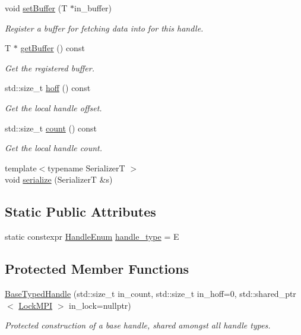 \begin{DoxyCompactItemize}
void \hyperlink{structvt_1_1rdma_1_1_base_typed_handle_acd1c1ff4fa00ba44ff7d7d6d92e82e5b}{set\+Buffer} (T $\ast$in\+\_\+buffer)
\begin{DoxyCompactList}\small\item\em Register a buffer for fetching data into for this handle. \end{DoxyCompactList}\item 
T $\ast$ \hyperlink{structvt_1_1rdma_1_1_base_typed_handle_a6774922e581a9b8c19eccf749077f577}{get\+Buffer} () const
\begin{DoxyCompactList}\small\item\em Get the registered buffer. \end{DoxyCompactList}\item 
std\+::size\+\_\+t \hyperlink{structvt_1_1rdma_1_1_base_typed_handle_a98bab5e776934a84c4415952823f58e0}{hoff} () const
\begin{DoxyCompactList}\small\item\em Get the local handle offset. \end{DoxyCompactList}\item 
std\+::size\+\_\+t \hyperlink{structvt_1_1rdma_1_1_base_typed_handle_a1e7937b5cf4b641a783c37675ae2cc35}{count} () const
\begin{DoxyCompactList}\small\item\em Get the local handle count. \end{DoxyCompactList}\item 
{\footnotesize template$<$typename SerializerT $>$ }\\void \hyperlink{structvt_1_1rdma_1_1_base_typed_handle_a40156625b7effaa3ba9febceb829e9a0}{serialize} (SerializerT \&s)
\end{DoxyCompactItemize}
\subsection*{Static Public Attributes}
\begin{DoxyCompactItemize}
\item 
static constexpr \hyperlink{namespacevt_1_1rdma_a0234ff19cfb3c04718cfdfd36b2d6d88}{Handle\+Enum} \hyperlink{structvt_1_1rdma_1_1_base_typed_handle_afdff2a8569424f4b9be14ac0f2daf5ca}{handle\+\_\+type} = E
\end{DoxyCompactItemize}
\subsection*{Protected Member Functions}
\begin{DoxyCompactItemize}
\item 
\hyperlink{structvt_1_1rdma_1_1_base_typed_handle_a95ecf3e18a04206024380385af06c007}{Base\+Typed\+Handle} (std\+::size\+\_\+t in\+\_\+count, std\+::size\+\_\+t in\+\_\+hoff=0, std\+::shared\+\_\+ptr$<$ \hyperlink{structvt_1_1rdma_1_1_lock_m_p_i}{Lock\+M\+PI} $>$ in\+\_\+lock=nullptr)
\begin{DoxyCompactList}\small\item\em Protected construction of a base handle, shared amongst all handle types. \end{DoxyCompactList}\end{DoxyCompactItemize}
